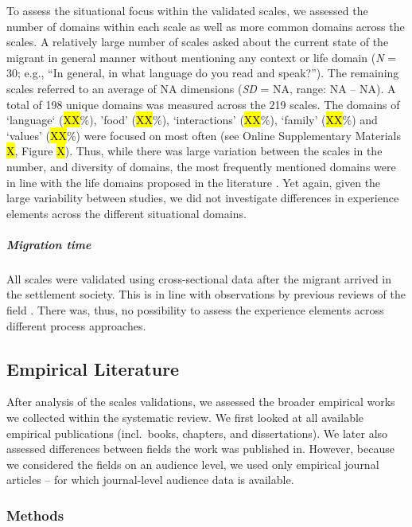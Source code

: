 To assess the situational focus within the validated scales, we assessed
the number of domains within each scale as well as more common domains
across the scales. A relatively large number of scales asked about the
current state of the migrant in general manner without mentioning any
context or life domain (\textit{N} = 30; e.g., ``In general, in what
language do you read and speak?''). The remaining scales referred to an
average of NA dimensions (\textit{SD} = NA, range: NA -- NA). A total of
198 unique domains was measured across the 219 scales. The domains of
`language` (\hl{XX}\%), 'food' (\hl{XX}\%), `interactions' (\hl{XX}\%),
`family' (\hl{XX}\%) and `values' (\hl{XX}\%) were focused on most often
(see Online Supplementary Materials \hl{X}, Figure \hl{X}). Thus, while
there was large variation between the scales in the number, and
diversity of domains, the most frequently mentioned domains were in line
with the life domains proposed in the literature
\citep[e.g.,][]{Arends-Toth2007}. Yet again, given the large variability
between studies, we did not investigate differences in experience
elements across the different situational domains.

\subparagraph{Migration time}

All scales were validated using cross-sectional data after the migrant
arrived in the settlement society. This is in line with observations by
previous reviews of the field \citep[e.g.,][]{Brown2011}. There was,
thus, no possibility to assess the experience elements across different
process approaches.

\subsection{Empirical Literature}

After analysis of the scales validations, we assessed the broader
empirical works we collected within the systematic review. We first
looked at all available empirical publications (incl.~books, chapters,
and dissertations). We later also assessed differences between fields
the work was published in. However, because we considered the fields on
an audience level, we used only empirical journal articles -- for which
journal-level audience data is available.

\subsubsection{Methods}

